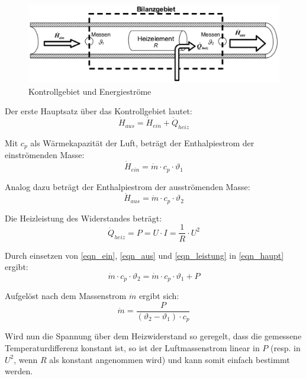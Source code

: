 \documentclass[a4paper,10pt,oneside]{article}
\begin{document}
\begin{figure}[H]
\centering
\includegraphics[width=\textwidth]{img/kontrollgebiet.eps}
\caption{Kontrollgebiet und Energieströme}
\label{kontrollgebiet}
\end{figure}

Der erste Hauptsatz über das Kontrollgebiet lautet:
\begin{equation}\label{eqn_haupt}
\dot{H}_{aus}=\dot{H}_{ein}+\dot{Q}_{heiz}
\end{equation}


Mit $c_p$ als Wärmekapazität der Luft, beträgt der Enthalpiestrom der einströmenden Masse:
\begin{equation}\label{eqn_ein}
\dot{H}_{ein}=\dot{m }\cdot c_p \cdot \vartheta_1
\end{equation}


Analog dazu beträgt der Enthalpiestrom der ausströmenden Masse:
\begin{equation}\label{eqn_aus}
\dot{H}_{aus}=\dot{m} \cdot c_p \cdot \vartheta_2
\end{equation}


Die Heizleistung des Widerstandes beträgt:
\begin{equation} \label{eqn_leistung}
\dot{Q}_{heiz}=P=U \cdot I = \frac{1}{R} \cdot U^2
\end{equation}


Durch einsetzen von \eqref{eqn_ein}, \eqref{eqn_aus} und \eqref{eqn_leistung} in \eqref{eqn_haupt} ergibt:
\begin{equation}
\dot{m} \cdot c_p \cdot \vartheta_2=\dot{m} \cdot c_p \cdot \vartheta_1+P
\end{equation}


Aufgelöst nach dem Massenstrom $\dot{m}$ ergibt sich:
\begin{equation}
\dot{m}=\frac{P}{\left(\vartheta_2 - \vartheta_1 \right) \cdot c_p}
\end{equation}


Wird nun die Spannung über dem Heizwiderstand so geregelt, dass die gemessene Temperaturdifferenz konstant ist, so ist der Luftmassenstrom linear in $P$ (resp. in $U^2$, wenn $R$ als konstant angenommen wird) und kann somit einfach bestimmt werden.
\end{document}
